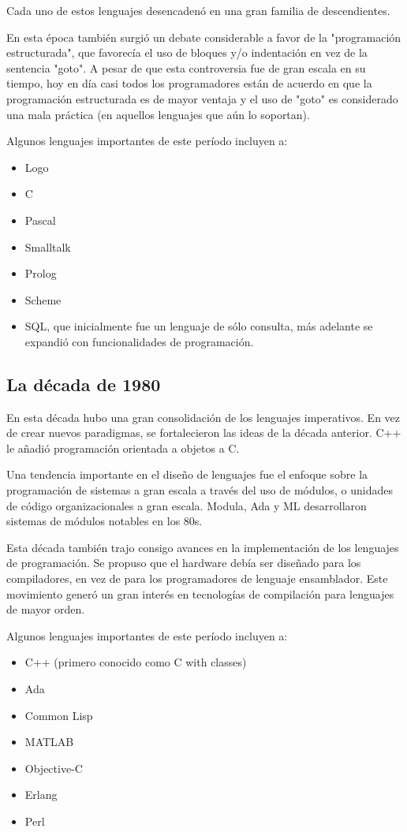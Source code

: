 \documentclass[a4paper,10pt]{article}
\begin{document}
Cada uno de estos lenguajes desencadenó en una gran familia de descendientes.

En esta época también surgió un debate considerable a favor de la "programación estructurada", que favorecía el uso de bloques y/o indentación en vez de la sentencia "goto". A pesar de que esta controversia fue de gran escala en su tiempo, hoy en día casi todos los programadores están de acuerdo en que la programación estructurada es de mayor ventaja y el uso de "goto" es considerado una mala práctica (en aquellos lenguajes que aún lo soportan).

Algunos lenguajes importantes de este período incluyen a:

\begin{itemize}
\item Logo
\item C
\item Pascal
\item Smalltalk
\item Prolog
\item Scheme
\item SQL, que inicialmente fue un lenguaje de sólo consulta, más adelante se expandió con funcionalidades de programación.
\end{itemize}

\subsection{La década de 1980}

En esta década hubo una gran consolidación de los lenguajes imperativos. En vez de crear nuevos paradigmas, se fortalecieron las ideas de la década anterior. C++ le añadió programación orientada a objetos a C.

Una tendencia importante en el diseño de lenguajes fue el enfoque sobre la programación de sistemas a gran escala a través del uso de módulos, o unidades de código organizacionales a gran escala. Modula, Ada y ML desarrollaron sistemas de módulos notables en los 80s.

Esta década también trajo consigo avances en la implementación de los lenguajes de programación. Se propuso que el hardware debía ser diseñado para los compiladores, en vez de para los programadores de lenguaje ensamblador. Este movimiento generó un gran interés en tecnologías de compilación para lenguajes de mayor orden.

Algunos lenguajes importantes de este período incluyen a:

\begin{itemize}
\item C++ (primero conocido como C with classes)
\item Ada
\item Common Lisp
\item MATLAB
\item Objective-C
\item Erlang
\item Perl
\end{itemize}
\end{document}
